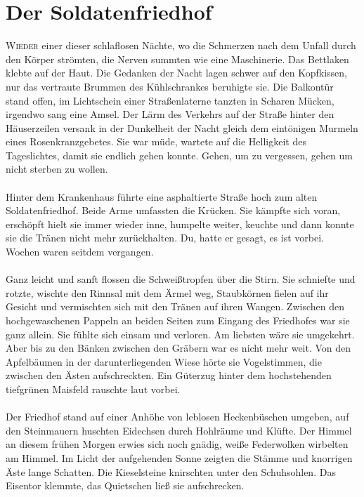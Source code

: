 \chapter{Der Soldatenfriedhof}
\lettrine{W}{ieder} einer dieser schlaflosen Nächte, wo die Schmerzen nach dem Unfall durch den Körper strömten, die Nerven summten wie eine Maschinerie. Das Bettlaken klebte auf der Haut. Die Gedanken der Nacht lagen schwer auf den Kopfkissen, nur das vertraute Brummen des Kühlschrankes beruhigte sie. Die Balkontür stand offen, im Lichtschein einer Straßenlaterne tanzten in Scharen Mücken, irgendwo sang eine Amsel. Der Lärm des Verkehrs auf der Straße hinter den Häuserzeilen versank in der Dunkelheit der Nacht gleich dem eintönigen Murmeln eines Rosenkranzgebetes. Sie war müde, wartete auf die Helligkeit des Tageslichtes, damit sie endlich gehen konnte. Gehen, um zu vergessen, gehen um nicht sterben zu wollen. \\\\
Hinter dem Krankenhaus führte eine asphaltierte Straße hoch zum alten Soldatenfriedhof. Beide Arme umfassten die Krücken. Sie kämpfte sich voran, erschöpft hielt sie immer wieder inne, humpelte weiter, keuchte und dann konnte sie die Tränen nicht mehr zurückhalten. Du, hatte er gesagt, es ist vorbei. Wochen waren seitdem vergangen.\\\\
Ganz leicht und sanft flossen die Schweißtropfen über die Stirn. Sie schniefte und rotzte, wischte den Rinnsal mit dem Ärmel weg, Staubkörnen fielen auf ihr Gesicht und vermischten sich mit den Tränen auf ihren Wangen. Zwischen den hochgewaschenen Pappeln an beiden Seiten zum Eingang des Friedhofes war sie ganz allein. Sie fühlte sich einsam und verloren. Am liebsten wäre sie umgekehrt. Aber bis zu den Bänken zwischen den Gräbern war es nicht mehr weit. Von den Apfelbäumen in der darunterliegenden Wiese hörte sie Vogelstimmen, die zwischen den Ästen aufschreckten. Ein Güterzug hinter dem hochstehenden tiefgrünen Maisfeld rauschte laut vorbei.\\\\ 
Der Friedhof stand auf einer Anhöhe von leblosen Heckenbüschen umgeben, auf den Steinmauern huschten Eidechsen durch Hohlräume und Klüfte. Der Himmel an diesem frühen Morgen erwies sich noch gnädig, weiße Federwolken wirbelten am Himmel. Im Licht der aufgehenden Sonne zeigten die Stämme und knorrigen Äste lange Schatten. Die Kieselsteine knirschten unter den Schuhsohlen. Das Eisentor klemmte, das Quietschen ließ sie aufschrecken.\\\\
